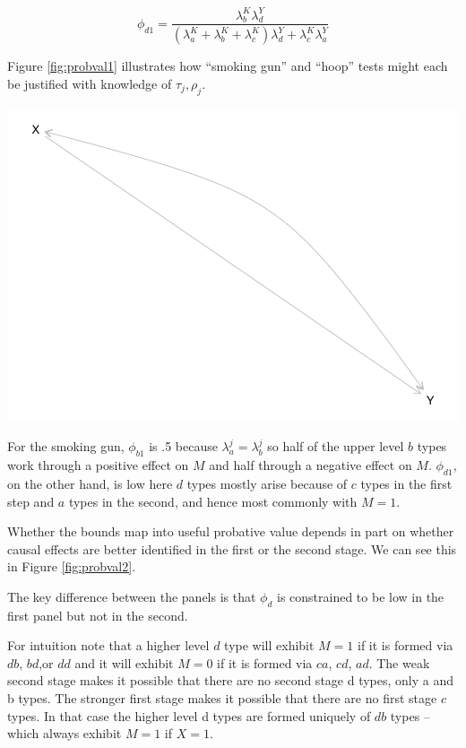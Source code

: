 \documentclass[12pt,]{book}
\begin{document}
\[\phi_{d1} = \frac{\lambda_{b}^K\lambda_{d}^Y}{(\lambda_{a}^K + \lambda_{b}^K + \lambda_{c}^K)\lambda_{d}^Y+ \lambda_{c}^K\lambda_{a}^Y}\]

Figure \ref{fig:probval1} illustrates how ``smoking gun'' and ``hoop'' tests might each be justified with knowledge of \(\tau_j, \rho_j\).

\includegraphics{ii_files/figure-latex/unnamed-chunk-105-1.pdf}

For the smoking gun, \(\phi_{b1}\) is .5 because \(\lambda_a^j = \lambda_b^j\) so half of the upper level \(b\) types work through a positive effect on \(M\) and half through a negative effect on \(M\). \(\phi_{d1}\), on the other hand, is low here \(d\) types mostly arise because of \(c\) types in the first step and \(a\) types in the second, and hence most commonly with \(M=1\).

Whether the bounds map into useful probative value depends in part on whether causal effects are better identified in the first or the second stage. We can see this in Figure \ref{fig:probval2}.

The key difference between the panels is that \(\phi_d\) is constrained to be low in the first panel but not in the second.

For intuition note that a higher level \(d\) type will exhibit \(M=1\) if it is formed via \(db\), \(bd\),or \(dd\) and it will exhibit \(M=0\) if it is formed via \(ca\), \(cd\), \(ad\). The weak second stage makes it possible that there are no second stage d types, only a and b types. The stronger first stage makes it possible that there are no first stage \(c\) types. In that case the higher level d types are formed uniquely of \(db\) types -- which always exhibit \(M=1\) if \(X=1\).
\end{document}
